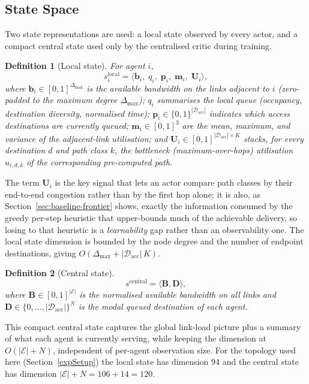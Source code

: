 \documentclass[10pt,journal,comsoc]{IEEEtran}
\newtheorem{definition}{Definition}
\begin{document}
\subsection{State Space}
Two state representations are used: a local state observed by every actor, and a compact central state used only by the centralised critic during training.

\begin{definition}[Local state]
  \label{local_state}
  For agent $i$,
  \[
    s_i^{\text{local}} = \big\langle \mathbf{b}_i,\; q_i,\; \mathbf{p}_i,\; \mathbf{m}_i,\; \mathbf{U}_i \big\rangle,
  \]
  where $\mathbf{b}_i \in [0,1]^{\Delta_{\max}}$ is the available bandwidth on the links adjacent to $i$ (zero-padded to the maximum degree $\Delta_{\max}$); $q_i$ summarises the local queue (occupancy, destination diversity, normalised time); $\mathbf{p}_i \in \{0,1\}^{|\mathcal{D}_{\text{acc}}|}$ indicates which access destinations are currently queued; $\mathbf{m}_i \in [0,1]^{3}$ are the mean, maximum, and variance of the adjacent-link utilisation; and $\mathbf{U}_i \in [0,1]^{|\mathcal{D}_{\text{acc}}|\times K}$ stacks, for every destination $d$ and path class $k$, the \emph{bottleneck} (maximum-over-hops) utilisation $u_{i,d,k}$ of the corresponding pre-computed path.
\end{definition}

The term $\mathbf{U}_i$ is the key signal that lets an actor compare path classes by their end-to-end congestion rather than by the first hop alone; it is also, as Section~\ref{sec:baseline-frontier} shows, exactly the information consumed by the greedy per-step heuristic that upper-bounds much of the achievable delivery, so losing to that heuristic is a \emph{learnability} gap rather than an observability one. The local state dimension is bounded by the node degree and the number of endpoint destinations, giving $O(\Delta_{\max} + |\mathcal{D}_{\text{acc}}|\,K)$.

\begin{definition}[Central state]
  \label{central_state}
  \[
    s^{\text{central}} = \langle \mathbf{B}, \mathbf{D} \rangle,
  \]
  where $\mathbf{B} \in [0,1]^{|\mathcal{E}|}$ is the normalised available bandwidth on all links and $\mathbf{D} \in \{0,\dots,|\mathcal{D}_{\text{acc}}|\}^{N}$ is the modal queued destination of each agent.
\end{definition}

This compact central state captures the global link-load picture plus a summary of what each agent is currently serving, while keeping the dimension at $O(|\mathcal{E}| + N)$, independent of per-agent observation size. For the topology used here (Section~\ref{expSetup}) the local state has dimension $94$ and the central state has dimension $|\mathcal{E}| + N = 106 + 14 = 120$.
\end{document}
